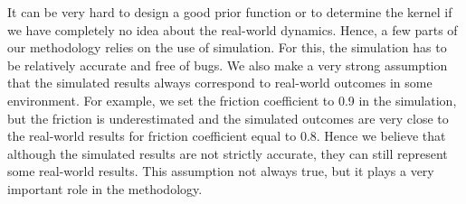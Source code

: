 It can be very hard to design a good prior function or to determine the kernel if we have completely no idea about the real-world dynamics.
Hence, a few parts of our methodology relies on the use of simulation.
For this, the simulation has to be relatively accurate and free of bugs.
We also make a very strong assumption that the simulated results always correspond to real-world outcomes in some environment. 
For example, we set the friction coefficient to 0.9 in the simulation, but the friction is underestimated and the simulated outcomes are very close to the real-world results for friction coefficient equal to 0.8.
Hence we believe that although the simulated results are not strictly accurate, they can still represent some real-world results.
This assumption not always true, but it plays a very important role in the methodology.



